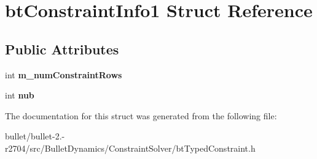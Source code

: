\hypertarget{structbt_constraint_info1}{\section{bt\+Constraint\+Info1 Struct Reference}
\label{structbt_constraint_info1}
}
\subsection*{Public Attributes}
\begin{DoxyCompactItemize}
\item 
\hypertarget{structbt_constraint_info1_a4686a149143b1fa15521d1bdbe979874}{int {\bfseries m\+\_\+num\+Constraint\+Rows}}\label{structbt_constraint_info1_a4686a149143b1fa15521d1bdbe979874}

\item 
\hypertarget{structbt_constraint_info1_a9c1b3a5d85cf307a2ef413e00d193df3}{int {\bfseries nub}}\label{structbt_constraint_info1_a9c1b3a5d85cf307a2ef413e00d193df3}

\end{DoxyCompactItemize}


The documentation for this struct was generated from the following file\+:\begin{DoxyCompactItemize}
\item 
bullet/bullet-\/2.-\/r2704/src/\+Bullet\+Dynamics/\+Constraint\+Solver/bt\+Typed\+Constraint.\+h\end{DoxyCompactItemize}
